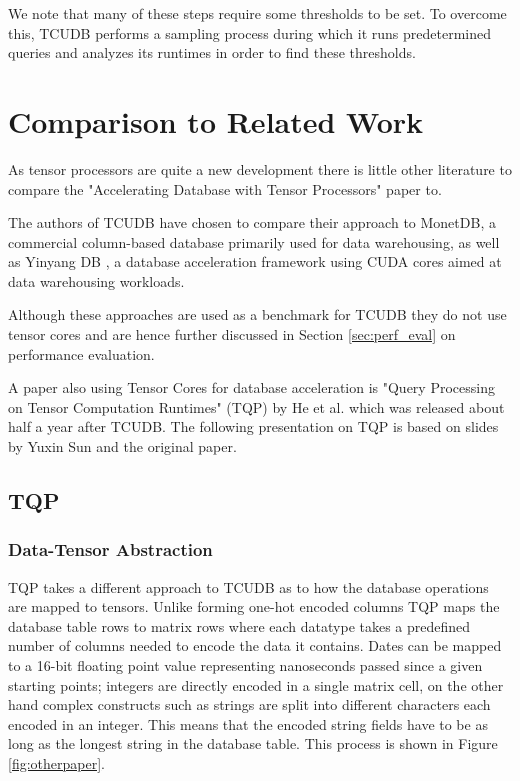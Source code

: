 \documentclass{paper}
\begin{document}
	We note that many of these steps require some thresholds to be set. To overcome this, TCUDB performs a sampling process during which it runs predetermined queries and analyzes its runtimes in order to find these thresholds.
	
	\section{Comparison to Related Work} \label{sec:rel_work}
	As tensor processors are quite a new development there is little other literature to compare the "Accelerating Database with Tensor Processors" paper to. 
	
	The authors of TCUDB have chosen to compare their approach to MonetDB, a commercial column-based database primarily used for data warehousing, as well as  Yinyang DB \cite{yuan2013yin}, a database acceleration framework using CUDA cores aimed at data warehousing workloads. 
	
	Although these approaches are used as a benchmark for TCUDB they do not use tensor cores and are hence further discussed in Section \ref{sec:perf_eval} on performance evaluation.
	
	A paper also using Tensor Cores for database acceleration is "Query Processing on Tensor Computation Runtimes" (TQP) \cite{he2022query} by He et al. which was released about half a year after TCUDB. The following presentation on TQP is based on slides by Yuxin Sun \cite{sun_2022} and the original paper.
	
	\subsection{TQP}
	
	\subsubsection{Data-Tensor Abstraction}
	
	TQP takes a different approach to TCUDB as to how the database operations are mapped to tensors. Unlike forming one-hot encoded columns TQP maps the database table rows to matrix rows where each datatype takes a predefined number of columns needed to encode the data it contains. Dates can be mapped to a 16-bit floating point value representing nanoseconds passed since a given starting points; integers are directly encoded in a single matrix cell, on the other hand complex constructs such as strings are split into different characters each encoded in an integer. This means that the encoded string fields have to be as long as the longest string in the database table. This process is shown in Figure \ref{fig:otherpaper}.
	
\end{document}
